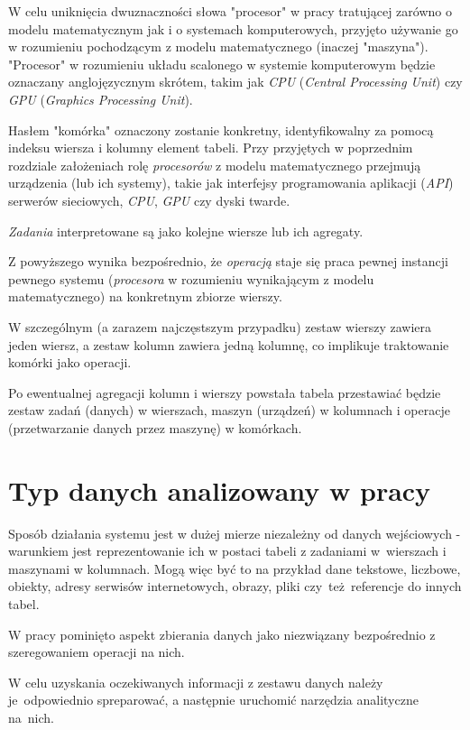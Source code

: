\documentclass[brudnopis]{xmgr}
\begin{document}
W celu uniknięcia dwuznaczności słowa "procesor" w pracy tratującej zarówno o modelu matematycznym jak i o systemach komputerowych, przyjęto używanie go w rozumieniu pochodzącym z modelu matematycznego (inaczej "maszyna").
"Procesor" w rozumieniu układu scalonego w systemie komputerowym będzie oznaczany anglojęzycznym skrótem, takim jak \emph{CPU} (\emph{Central Processing Unit}) czy \emph{GPU} (\emph{Graphics Processing Unit}).
\medskip

Hasłem "komórka" oznaczony zostanie konkretny, identyfikowalny za pomocą indeksu wiersza i kolumny element tabeli.
Przy przyjętych w poprzednim rozdziale założeniach rolę \emph{procesorów} z modelu matematycznego przejmują urządzenia (lub ich systemy), takie jak interfejsy programowania aplikacji (\emph{API}) serwerów sieciowych, \emph{CPU}, \emph{GPU} czy dyski twarde.
\medskip

\emph{Zadania} interpretowane są jako kolejne wiersze lub ich agregaty.
\medskip

Z powyższego wynika bezpośrednio, że \emph{operacją} staje się praca pewnej instancji pewnego systemu (\emph{procesora} w rozumieniu wynikającym z modelu matematycznego) na konkretnym zbiorze wierszy.
\medskip

W szczególnym (a zarazem najczęstszym przypadku) zestaw wierszy zawiera jeden wiersz, a zestaw kolumn zawiera jedną kolumnę, co implikuje traktowanie komórki jako operacji.
\medskip

Po ewentualnej agregacji kolumn i wierszy powstała tabela przestawiać będzie zestaw zadań (danych) w wierszach, maszyn (urządzeń) w kolumnach i operacje (przetwarzanie danych przez maszynę) w komórkach.



\chapter{Typ danych analizowany w pracy}

Sposób działania systemu jest w dużej mierze niezależny od danych wejściowych - warunkiem jest reprezentowanie ich w postaci tabeli z zadaniami w~wierszach i maszynami w kolumnach.
Mogą więc być to na przykład dane tekstowe, liczbowe, obiekty, adresy serwisów internetowych, obrazy, pliki czy~też~referencje do innych tabel.
\medskip

W pracy pominięto aspekt zbierania danych jako niezwiązany bezpośrednio z szeregowaniem operacji na nich.
\medskip

W celu uzyskania oczekiwanych informacji z zestawu danych należy je~odpowiednio spreparować, a następnie uruchomić narzędzia analityczne na~nich.
\medskip
\end{document}

